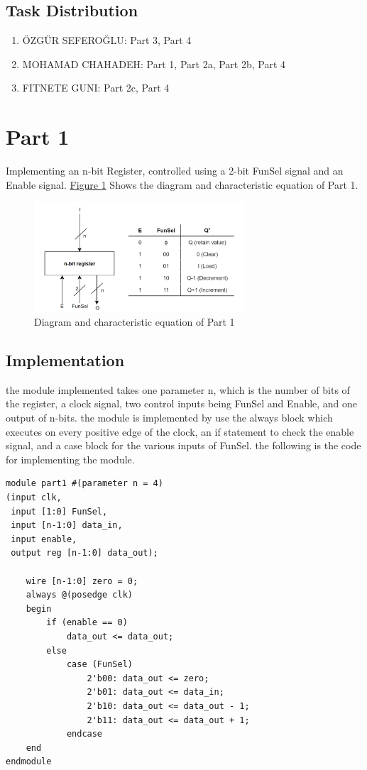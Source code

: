 \documentclass[pdftex,12pt,a4paper]{article}
\begin{document}
\subsection{Task Distribution}
\begin{enumerate}
\item ÖZGÜR SEFEROĞLU:  Part 3, Part 4
\item MOHAMAD CHAHADEH:  Part 1, Part 2a, Part 2b, Part 4
\item FITNETE GUNI: Part 2c, Part 4
\end{enumerate}

\pagebreak

\section{Part 1}
Implementing an n-bit Register, controlled using a 2-bit FunSel signal and an Enable signal. \hyperref[fig:part1_char]{Figure \ref{fig:part1_char}} Shows the diagram and characteristic equation of Part 1.

\begin{figure}[H]
\centering
\includegraphics[width=0.7\textwidth]{part1_diagram.png}
\caption{Diagram and characteristic equation of Part 1}
\label{fig:part1_char}
\end{figure}

\subsection{Implementation}
the module implemented takes one parameter n, which is the number of bits of the register, a clock signal, two control inputs being FunSel and Enable, and one output of n-bits. the module is implemented by use the always block which executes on every positive edge of the clock, an if statement to check the enable signal, and a case block for the various inputs of FunSel. the following is the code for implementing the module.
\vspace{0.7cm}

\begin{lstlisting}
module part1 #(parameter n = 4) 
(input clk,
 input [1:0] FunSel,
 input [n-1:0] data_in, 
 input enable, 
 output reg [n-1:0] data_out);

    wire [n-1:0] zero = 0;
    always @(posedge clk)
    begin
        if (enable == 0)
            data_out <= data_out;
        else
            case (FunSel)
                2'b00: data_out <= zero;
                2'b01: data_out <= data_in;
                2'b10: data_out <= data_out - 1;
                2'b11: data_out <= data_out + 1;
            endcase
    end
endmodule
\end{lstlisting}
\end{document}
